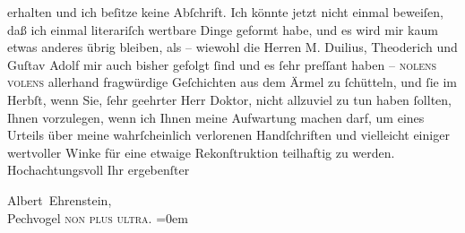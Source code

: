                erhalten und ich beſitze keine Abſchrift. Ich könnte jetzt nicht einmal beweiſen, daß
               ich einmal literariſch wertbare Dinge geformt habe, und es wird mir kaum etwas
               anderes übrig bleiben, als – wiewohl die Herren M.
                  Duilius, Theoderich und Guſtav Adolf mir auch bisher gefolgt{ }ſind und es{ }ſehr {\pb}preſſant haben – \textsc{nolens volens} allerhand fragwürdige Geſchichten aus dem
               Ärmel zu{ }ſchütteln, und{ }ſie im Herbſt, wenn Sie,{ }ſehr geehrter Herr Doktor, nicht
               allzuviel zu tun haben{ }ſollten, Ihnen vorzulegen, wenn ich Ihnen meine Aufwartung
               machen darf, um eines Urteils über meine wahrſcheinlich verlorenen Handſchriften und
               vielleicht einiger wertvoller Winke für eine etwaige Rekonſtruktion teilhaftig zu
               werden. Hochachtungsvoll Ihr ergebenſter\pend
           
\pstart
           \spacefill\mbox{Albert Ehrenstein,}{\\[\baselineskip]}Pechvogel \textsc{non plus ultra.}\pend
           \leftskip=0em{}\endnumbering{}  \newcommand{\dateiname}{L01867}\newcommand{\titel}{Albert Ehrenstein an Arthur Schnitzler, 24. 8. 1909}\newcommand{\editorInnen}{Martin Anton Müller und Gerd-Hermann Susen}
